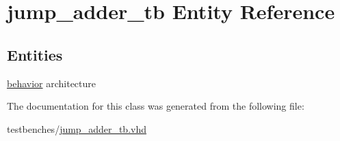 \hypertarget{classjump__adder__tb}{\section{jump\-\_\-adder\-\_\-tb \-Entity \-Reference}
\label{classjump__adder__tb}
}
\subsection*{\-Entities}
\begin{DoxyCompactItemize}
\item 
\hyperlink{classjump__adder__tb_1_1behavior}{behavior} architecture
\end{DoxyCompactItemize}


\-The documentation for this class was generated from the following file\-:\begin{DoxyCompactItemize}
\item 
testbenches/\hyperlink{jump__adder__tb_8vhd}{jump\-\_\-adder\-\_\-tb.\-vhd}\end{DoxyCompactItemize}
